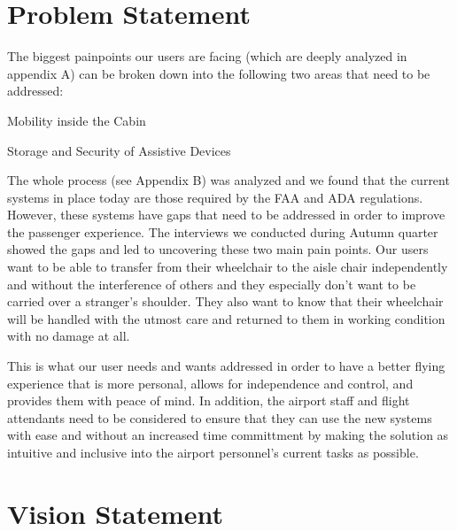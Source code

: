 
\section{Problem Statement}
The biggest painpoints our users are facing (which are deeply analyzed in appendix A) can be broken down into the following two areas that need to be addressed:

\begin{list}{-}{}
  \item Mobility inside the Cabin
  \item Storage and Security of Assistive Devices
\end{list}

The whole process (see Appendix B) was analyzed and  we found that the current systems in place today are those required by the FAA and ADA regulations.  However, these systems have gaps that need to be addressed in order to improve the passenger experience.  The interviews we conducted during Autumn quarter showed the gaps and led to uncovering these two main pain points. Our users want to be able to transfer from their wheelchair to the aisle chair independently and without the interference of others and they especially don't want to be carried over a stranger's shoulder.  They also want to know that their wheelchair will be handled with the utmost care and returned to them in working condition with no damage at all.   

This is what our user needs and wants addressed in order to have a better flying experience that is more personal, allows for independence and control, and provides them with peace of mind. In addition, the airport staff and flight attendants need to be considered to ensure that they can use the new systems with ease and without an increased time committment by making the solution as intuitive and inclusive into the airport personnel's current tasks as possible. 


\section{Vision Statement}

